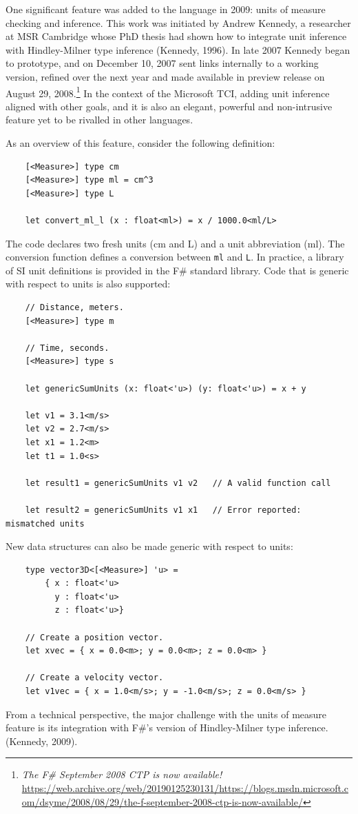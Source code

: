 \documentclass[acmsmall]{acmart}\settopmatter{}
\begin{document}
One significant feature was added to the language in 2009: units of measure checking and inference.  This
work was initiated by Andrew Kennedy, a researcher at MSR Cambridge whose PhD thesis had shown how to integrate
unit inference with Hindley-Milner type inference (Kennedy, 1996). In late 2007 Kennedy began to prototype, and on
December 10, 2007 sent links internally to a working version, refined over the next year and made available in preview
release on August 29, 2008.\footnote{\textit{The F\# September 2008 CTP is now available!} \url{https://web.archive.org/web/20190125230131/https://blogs.msdn.microsoft.com/dsyme/2008/08/29/the-f-september-2008-ctp-is-now-available/}}
In the context of the Microsoft TCI, adding unit inference aligned with other goals, and it
is also an elegant, powerful and non-intrusive feature yet to be rivalled in other languages.

As an overview of this feature, consider the following definition:

\begin{verbatim}
    [<Measure>] type cm
    [<Measure>] type ml = cm^3
    [<Measure>] type L

    let convert_ml_l (x : float<ml>) = x / 1000.0<ml/L>
\end{verbatim}

The code declares two fresh units (cm and L) and a unit abbreviation (ml).  The conversion function defines a conversion
between \texttt{ml} and \texttt{L}.  In practice, a library of SI unit definitions is provided in the F\# standard library.  Code
that is generic with respect to units is also supported:

\begin{verbatim}
    // Distance, meters.
    [<Measure>] type m

    // Time, seconds.
    [<Measure>] type s

    let genericSumUnits (x: float<'u>) (y: float<'u>) = x + y

    let v1 = 3.1<m/s>
    let v2 = 2.7<m/s>
    let x1 = 1.2<m>
    let t1 = 1.0<s>

    let result1 = genericSumUnits v1 v2   // A valid function call

    let result2 = genericSumUnits v1 x1   // Error reported: mismatched units
\end{verbatim}
New data structures can also be made generic with respect to units:
\begin{verbatim}
    type vector3D<[<Measure>] 'u> =
        { x : float<'u>
          y : float<'u>
          z : float<'u>}

    // Create a position vector.
    let xvec = { x = 0.0<m>; y = 0.0<m>; z = 0.0<m> }

    // Create a velocity vector.
    let v1vec = { x = 1.0<m/s>; y = -1.0<m/s>; z = 0.0<m/s> }
\end{verbatim}
From a technical perspective, the major challenge with the units of measure feature is its integration with F\#’s version of Hindley-Milner type inference. (Kennedy, 2009).
\end{document}
